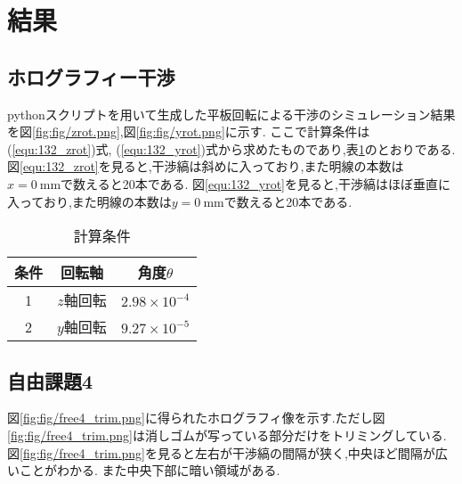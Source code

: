 \section{結果}
\subsection{ホログラフィー干渉}
pythonスクリプトを用いて生成した平板回転による干渉のシミュレーション結果を図\ref{fig:fig/zrot.png},図\ref{fig:fig/yrot.png}に示す.
ここで計算条件は(\ref{equ:132_zrot})式, (\ref{equ:132_yrot})式から求めたものであり,表\ref{tab:keisanjouken}のとおりである.
図\ref{equ:132_zrot}を見ると,干渉縞は斜めに入っており,また明線の本数は$x=0\ \si{\milli\metre}$で数えると20本である.
図\ref{equ:132_yrot}を見ると,干渉縞はほぼ垂直に入っており,また明線の本数は$y=0\ \si{\milli\metre}$で数えると20本である.
\begin{table}[h]
\caption{計算条件}
\label{tab:keisanjouken}
\centering
\begin{tabular}{ccc}
\hline
条件&回転軸&角度$\theta$\\
\hline \hline
1&$z$軸回転&$2.98\times10^{-4}$\\
2&$y$軸回転&$9.27\times10^{-5}$\\
\hline
\end{tabular}
\end{table}
\subsection{自由課題4}
図\ref{fig:fig/free4_trim.png}に得られたホログラフィ像を示す.ただし図\ref{fig:fig/free4_trim.png}は消しゴムが写っている部分だけをトリミングしている.
図\ref{fig:fig/free4_trim.png}を見ると左右が干渉縞の間隔が狭く,中央ほど間隔が広いことがわかる.
また中央下部に暗い領域がある.
